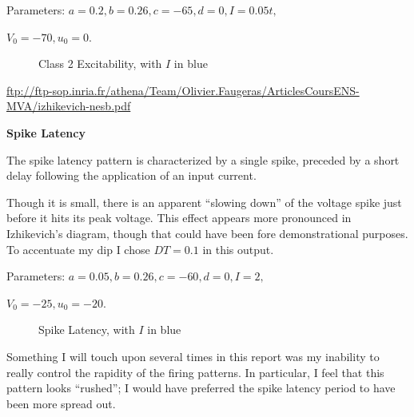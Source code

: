 \documentclass[a4paper,12pt]{article}
\begin{document}
\vspace{2mm} 

Parameters: $a=0.2, b=0.26, c=-65, d=0, I=0.05t, $

\vspace{1mm}

$V_{0}=-70, u_{0}=0$. 

\begin{figure}[h!]
\begin{center}
\end{center}
\caption{\label{pict8}Class 2 Excitability, with $I$ in blue}
\end{figure}

\url{ftp://ftp-sop.inria.fr/athena/Team/Olivier.Faugeras/ArticlesCoursENS-MVA/izhikevich-nesb.pdf}

\vfil\eject

{\bf Spike Latency}
\bigskip

The spike latency pattern is characterized by a single spike, preceded by a short delay following the application of an input current. 

\vspace{2mm}

Though it is small, there is an apparent ``slowing down'' of the voltage spike just before it hits its peak voltage. This effect appears more pronounced in Izhikevich's diagram, though that could have been fore demonstrational purposes. To accentuate my dip I chose $DT=0.1$ in this output. 
 
\vspace{2mm} 

Parameters: $a=0.05, b=0.26, c=-60, d=0, I=2, $

\vspace{1mm}

$V_{0}=-25, u_{0}=-20$. 

\begin{figure}[h!]
\begin{center}
\end{center}
\caption{\label{pict9}Spike Latency, with $I$ in blue}
\end{figure}

Something I will touch upon several times in this report was my inability to really control the rapidity of the firing patterns. In particular, I feel that this pattern looks ``rushed''; I would have preferred the spike latency period to have been more spread out. 
\end{document}
